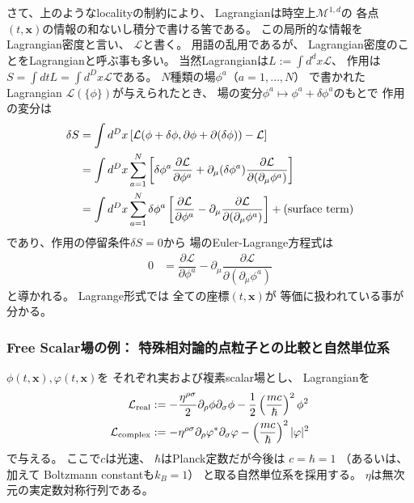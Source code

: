 さて、上のようなlocalityの制約により、
Lagrangianは時空上$\mathcal{M}^{1,d}$の
各点$(t, \bm{x})$の情報の和ないし積分で書ける筈である。
この局所的な情報をLagrangian密度と言い、
$\mathcal{L}$と書く。
用語の乱用であるが、
Lagrangian密度のことをLagrangianと呼ぶ事も多い。
当然Lagrangianは$L := \int d^d x \mathcal{L}$、
作用は$S= \int dt L = \int d^D x \mathcal{L}$である。
$N$種類の場$\phi^a$（$a = 1, \dots, N$）
で書かれたLagrangian
$\mathcal{L}(\{ \phi \})$が与えられたとき、
場の変分$\phi^a \mapsto
\phi^a + \delta \phi^a$のもとで
作用の変分は
\begin{align}
    \delta S
    &=
    \int d^D x
    \left[
        \mathcal{L}(\phi + \delta \phi ,
        \partial \phi + \partial (\delta \phi))
        - \mathcal{L}
    \right]
\notag\\&=
    \int d^D x
        \sum_{a = 1}^N
    \left[
        \delta \phi^a
        \dfrac{\partial \mathcal{L}}
            {\partial \phi^a}
        +
        \partial_\mu (\delta \phi^a)
        \dfrac{\partial \mathcal{L}}
            {\partial (\partial_\mu \phi^a)}
    \right]
\notag\\&=
    \int d^D x
        \sum_{a = 1}^N
    \delta \phi^a
    \left[
        \dfrac{\partial \mathcal{L}}
            {\partial \phi^a}
        -
        \partial_\mu
        \dfrac{\partial \mathcal{L}}
            {\partial (\partial_\mu \phi^a)}
    \right]
    + \text{(surface term)}
\end{align}
であり、作用の停留条件$\delta S = 0$から
場のEuler-Lagrange方程式は
\begin{align}
    0 &=
    \dfrac{\partial \mathcal{L}}
        {\partial \phi^a}
    -
    \partial_\mu
    \dfrac{\partial \mathcal{L}}
        {\partial (\partial_\mu \phi^a)}
\label{field EL eq}
\end{align}
と導かれる。
Lagrange形式では
全ての座標$(t, \bm{x})$が
等価に扱われている事が分かる。

\subsubsection{Free Scalar場の例：
    特殊相対論的点粒子との比較と自然単位系}

$\phi(t, \bm{x}), \varphi(t, \bm{x})$を
それぞれ実および複素scalar場とし、
Lagrangianを
\begin{align}
    \mathcal{L}_{\rm real}
    &:=
    -
    \dfrac{ \eta^{\rho\sigma} }{2}
        \partial_\rho \phi
        \partial_\sigma \phi
    -
    \dfrac{1}{2}
    \left(
        \dfrac{m c}{\hbar}
    \right)^2
    \phi^2
\label{free real scalar lagrangian}
\\
    \mathcal{L}_{\rm complex}
    &:=
    -
    \eta^{\rho\sigma}
        \partial_\rho \varphi^*
        \partial_\sigma \varphi
    -
    \left(
        \dfrac{m c}{\hbar}
    \right)^2
    |\varphi|^2
\label{free complex scalar lagrangian}
\end{align}
で与える。
ここで$c$は光速、
$\hbar$はPlanck定数だが今後は
$c = \hbar = 1$
（あるいは、加えて
Boltzmann constantも$k_B = 1$）
と取る自然単位系を採用する。
$\eta$は無次元の実定数対称行列である。

